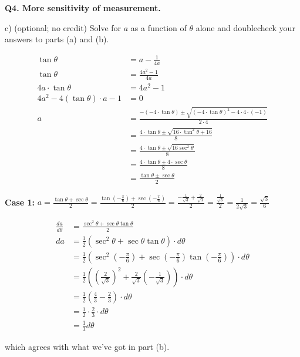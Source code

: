 \documentclass[9pt]{article}
\begin{document}
\begin{tcolorbox}
  \textbf{Q4. More sensitivity of measurement.}

  c) (optional; no credit) Solve for $a$ as a function of $\theta$ alone and doublecheck your answers to parts (a) and (b).
\end{tcolorbox}

\begin{align*}
  \tan \theta &= a - \frac{1}{4a} \\
  \tan \theta &= \frac{4a^2 - 1}{4a} \\
  4a \cdot \tan \theta &= 4a^2 - 1 \\
  4a^2 - 4 (\tan \theta) \cdot a - 1 &= 0 \\
  a &= \frac{-(-4 \cdot \tan \theta) \pm \sqrt{(-4 \cdot \tan \theta)^2 - 4 \cdot 4 \cdot (-1)}}{2 \cdot 4} \\
    &= \frac{4 \cdot \tan \theta \pm \sqrt{16 \cdot \tan^2 \theta + 16}}{8} \\
    &= \frac{4 \cdot \tan \theta \pm \sqrt{16 \sec^2 \theta}}{8} \\
    &= \frac{4 \cdot \tan \theta \pm 4 \cdot \sec \theta}{8} \\
    &= \frac{\tan \theta \pm \sec \theta}{2}
\end{align*}

\textbf{Case 1:} $a = \frac{\tan \theta + \sec \theta}{2} = \frac{\tan (-\frac{\pi}{6}) + \sec (-\frac{\pi}{6})}{2} = \frac{-\frac{1}{\sqrt{3}} + \frac{2}{\sqrt{3}}}{2} = \frac{\frac{1}{\sqrt{3}}}{2} = \frac{1}{2 \sqrt{3}} = \frac{\sqrt{3}}{6}$

\begin{align*}
  \frac{da}{d \theta} &= \frac{\sec^2 \theta + \sec \theta \tan \theta}{2} \\
  da &= \frac{1}{2} (\sec^2 \theta + \sec \theta \tan \theta) \cdot d \theta \\
     &= \frac{1}{2} (\sec^2 (-\frac{\pi}{6}) + \sec(-\frac{\pi}{6}) \tan(-\frac{\pi}{6})) \cdot d \theta \\
     &= \frac{1}{2} ((\frac{2}{\sqrt{3}})^2 + \frac{2}{\sqrt{3}}(-\frac{1}{\sqrt{3}})) \cdot d \theta \\
     &= \frac{1}{2} (\frac{4}{3} - \frac{2}{3}) \cdot d \theta \\
     &= \frac{1}{2} \cdot \frac{2}{3} \cdot d \theta \\
     &= \frac{1}{3} d \theta
\end{align*}

which agrees with what we've got in part (b).
\end{document}
